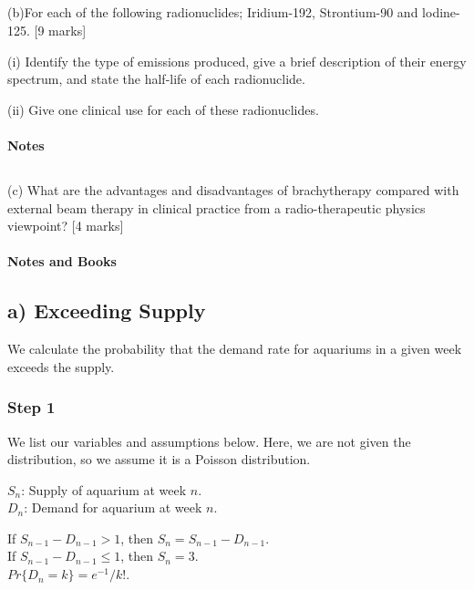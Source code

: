 \documentclass[11pt,letterpaper]{article}
\begin{document}
\subsection*{}(b)For each of the following radionuclides; Iridium-192, Strontium-90 and lodine-125. [9 marks]

(i) Identify the type of emissions produced, give a brief description of their energy spectrum,
and state the half-life of each radionuclide.


(ii) Give one clinical use for each of these radionuclides.

\paragraph{Notes}

\subsection*{}(c) What are the advantages and disadvantages of brachytherapy compared with external beam therapy in clinical practice from a radio-therapeutic physics viewpoint? [4 marks]

\paragraph*{Notes and Books}


\newpage
\subsection*{a) Exceeding Supply}
We calculate the probability that the demand rate for aquariums in a given week exceeds the supply.



\subsubsection*{Step 1}
We list our variables and assumptions below. Here, we are not given the distribution, so we assume it is a Poisson distribution.

\begin{minipage}{0.5\textwidth}
$S_n$: Supply of aquarium at week $n$. \\
$D_n$: Demand for aquarium at week $n$.
\end{minipage}
\begin{minipage}{0.5\textwidth}
If $S_{n-1} - D_{n-1} > 1$, then $S_n = S_{n-1} - D_{n-1}$. \\
If $S_{n-1} - D_{n-1} \leq 1$, then $S_n = 3$. \\
$Pr\{D_n = k\} = e^{-1}/k!$.
\end{minipage}
\end{document}
